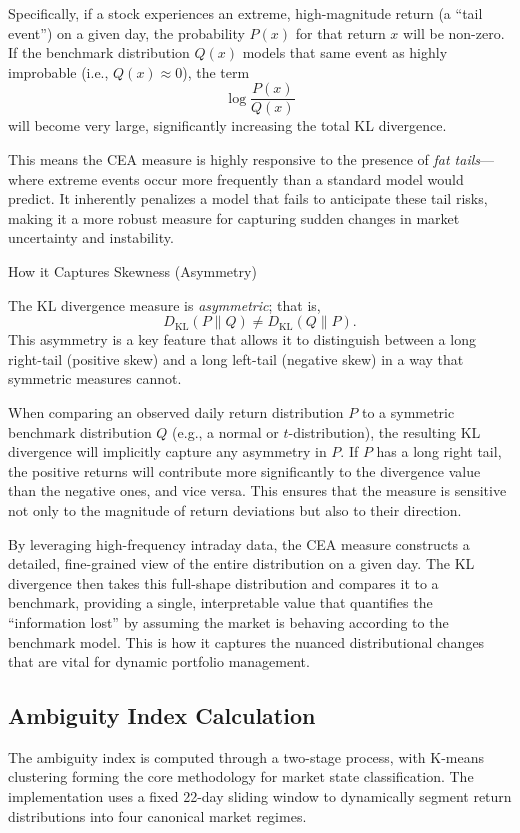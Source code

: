 \documentclass[preprint,12pt,authoryear]{elsarticle}
\begin{document}
Specifically, if a stock experiences an extreme, high-magnitude return (a ``tail event'') on a given day, the probability $P(x)$ for that return $x$ will be non-zero. If the benchmark distribution $Q(x)$ models that same event as highly improbable (i.e., $Q(x) \approx 0$), the term 
\[
\log \frac{P(x)}{Q(x)}
\]
will become very large, significantly increasing the total KL divergence.  

This means the CEA measure is highly responsive to the presence of \emph{fat tails}—where extreme events occur more frequently than a standard model would predict. It inherently penalizes a model that fails to anticipate these tail risks, making it a more robust measure for capturing sudden changes in market uncertainty and instability.  

How it Captures Skewness (Asymmetry)

The KL divergence measure is \emph{asymmetric}; that is,
\[
D_{\mathrm{KL}}(P \parallel Q) \neq D_{\mathrm{KL}}(Q \parallel P).
\]
This asymmetry is a key feature that allows it to distinguish between a long right-tail (positive skew) and a long left-tail (negative skew) in a way that symmetric measures cannot.  

When comparing an observed daily return distribution $P$ to a symmetric benchmark distribution $Q$ (e.g., a normal or $t$-distribution), the resulting KL divergence will implicitly capture any asymmetry in $P$. If $P$ has a long right tail, the positive returns will contribute more significantly to the divergence value than the negative ones, and vice versa. This ensures that the measure is sensitive not only to the magnitude of return deviations but also to their direction.

By leveraging high-frequency intraday data, the CEA measure constructs a detailed, fine-grained view of the entire distribution on a given day. The KL divergence then takes this full-shape distribution and compares it to a benchmark, providing a single, interpretable value that quantifies the ``information lost'' by assuming the market is behaving according to the benchmark model. This is how it captures the nuanced distributional changes that are vital for dynamic portfolio management.

\subsection*{Ambiguity Index Calculation}
The ambiguity index is computed through a two-stage process, with K-means clustering forming the core methodology for market state classification. The implementation uses a fixed 22-day sliding window to dynamically segment return distributions into four canonical market regimes.
\end{document}
